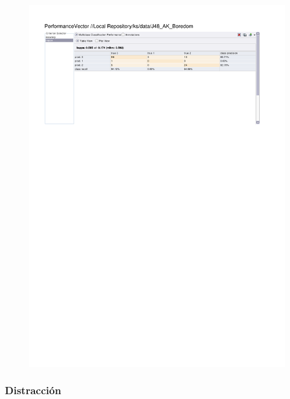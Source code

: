 \begin{figure}[htp]
  \centerline{\includegraphics[trim=0 680 0 60,clip,width=16.09cm]{results/J48_K_Boredom.pdf}} \caption{
} \label{J48_K_Boredom}
\end{figure}

\clearpage
\FloatBarrier
\subsubsection{Distracción}

